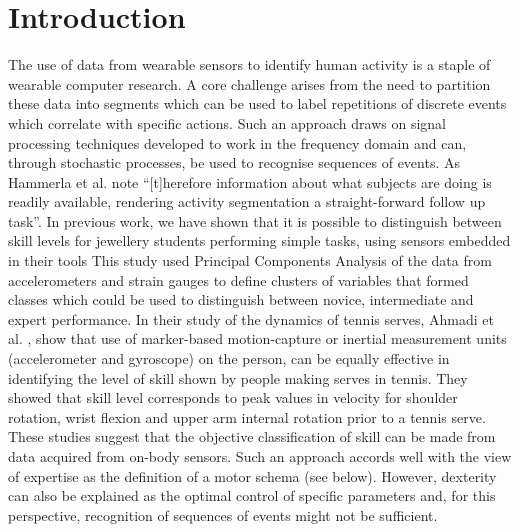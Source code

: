 \documentclass{sigchi}
\begin{document}


\section{Introduction}

The use of data from wearable sensors to identify human activity is a staple of wearable computer research.
A core challenge arises from the need to partition these data into segments 
which can be used to label repetitions of discrete events which correlate with specific actions. 
Such an approach draws on signal processing techniques developed to work in the frequency domain and can, 
through stochastic processes, be used to recognise sequences of events.  As Hammerla et al. \cite{Hammerla2011}
note ``[t]herefore information about what subjects are doing is readily available, rendering activity 
segmentation a straight-forward follow up task''. 
In previous work, we have shown that it is possible to distinguish between skill levels for jewellery 
students performing simple tasks, using sensors embedded in their tools \cite{RefXXX}
This study used Principal Components Analysis of the data from accelerometers and strain gauges to define 
clusters of variables that formed classes which could be used to distinguish between novice, intermediate 
and expert performance.  In their study of the dynamics of tennis serves,  Ahmadi et al. \cite{Ahmadi2010}, 
show that use of marker-based motion-capture or inertial measurement units (accelerometer and gyroscope) 
on the person, can be equally effective in identifying the level of skill shown by people making serves 
in tennis.  They showed that skill level corresponds to peak values in velocity for shoulder rotation, 
wrist flexion and upper arm internal rotation prior to a tennis serve. These studies suggest that the objective 
classification of skill can be made from data acquired from on-body sensors. 
Such an approach accords well with the view of expertise as the definition of a motor schema (see below). 
However, dexterity can also be explained as the optimal control of specific parameters and, for this perspective, 
recognition of sequences of events might not be sufficient. 
\end{document}
